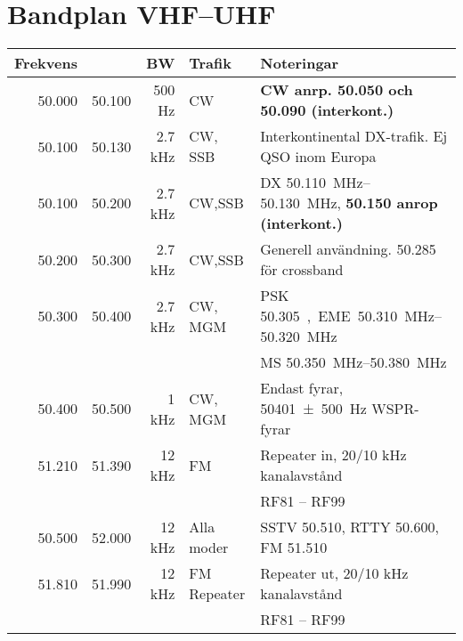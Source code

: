 \section{Bandplan VHF--UHF}

\begin{tabular}{rrrll}
\textbf{Frekvens} &        & \textbf{BW} & \textbf{Trafik} & \textbf{Noteringar}                                                         \\ \hline
50.000 & 50.100 &      500 Hz & CW              & \textbf{CW anrp. 50.050 och 50.090 (interkont.)}                            \\ \hline
50.100 & 50.130 &     2.7 kHz & CW, SSB         & Interkontinental DX-trafik. Ej QSO inom Europa                              \\ \hline
50.100 & 50.200 &     2.7 kHz & CW,SSB          & DX \SIrange{50,110}{50,130}{MHz}, \textbf{\SI{50,150}{} anrop (interkont.)} \\ \hline
50.200 & 50.300 &     2.7 kHz & CW,SSB          & Generell användning. \SI{50,285}{} för crossband                            \\ \hline
50.300 & 50.400 &     2.7 kHz & CW, MGM         & PSK \SI{50,305}, EME \SIrange{50,310}{50,320}{MHz}                          \\
       &        &             &                 & MS \SIrange{50,350}{50,380}{MHz}                                            \\ \hline
50.400 & 50.500 &       1 kHz & CW, MGM         & Endast fyrar, \SI{50401(500)}{Hz} WSPR-fyrar                                \\ \hline
51.210 & 51.390 &      12 kHz & FM              & Repeater in, 20/10 kHz kanalavstånd                                         \\
       &        &             &                 & RF81 – RF99                                                                 \\ \hline
50.500 & 52.000 &      12 kHz & Alla moder      & SSTV \SI{50,510}{}, RTTY \SI{50,600}{}, FM \SI{51,510}{}                    \\ \hline
51.810 & 51.990 &      12 kHz & FM Repeater     & Repeater ut, 20/10 kHz kanalavstånd                                         \\
       &        &             &                 & RF81 – RF99                                                                 \\ \hline
\end{tabular}

